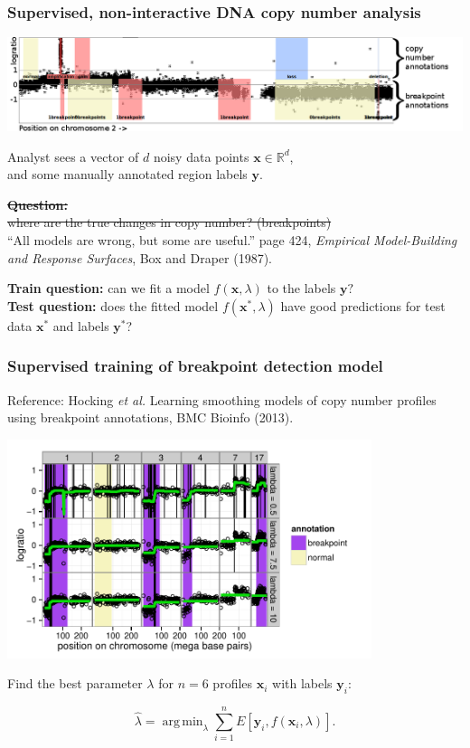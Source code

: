 \documentclass{beamer}
\DeclareMathOperator*{\argmin}{arg\,min}
\newcommand{\RR}{\mathbb R}
\begin{document}
\begin{frame}
  \frametitle{Supervised, non-interactive DNA copy number analysis}

  \includegraphics[width=\textwidth]{regions-axes-full}

  Analyst sees a vector of $d$ noisy data points $\mathbf x\in\RR^d$,\\
  and some manually annotated region labels $\mathbf y$.

  \vskip 0.1in

  \sout{\textbf{Question:}\\
    where are the true changes in copy number? (breakpoints)}
  \\
  ``All models are wrong, but some are useful.'' page 424, \textit{Empirical
    Model-Building and Response Surfaces}, Box and Draper (1987).

  \vskip 0.1in

  \textbf{Train question:} can we fit a model $f(\mathbf x, \lambda)$
  to the labels $\mathbf y?$
  \\
  \textbf{Test question:} does the fitted model $f(\mathbf x^*, \lambda)$
  have good predictions for test data $\mathbf x^*$ and labels $\mathbf y^*$?
\end{frame}

\begin{frame}
  \frametitle{Supervised training of breakpoint detection model}

  Reference: Hocking \textit{et al.} Learning smoothing models of copy
  number profiles using breakpoint annotations, BMC Bioinfo
  (2013).

  \includegraphics[width=0.8\textwidth]{bams-smoothing}

  Find the best parameter $\lambda$ for $n=6$ profiles $\mathbf x_i$
  with labels $\mathbf y_i$:

  \begin{equation*}
    \hat \lambda = \argmin_{\lambda}
    \sum_{i=1}^n
    E\left[
      \mathbf y_i,
      f(\mathbf x_i, \lambda)
    \right].
  \end{equation*}

\end{frame}
\end{document}
